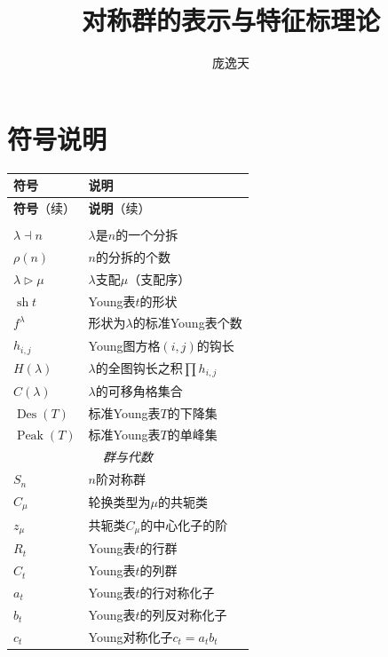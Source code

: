 \documentclass{sjtureport}
\title{对称群的表示与特征标理论}
\author{庞逸天}
\renewcommand{\arraystretch}{1}
\DeclareMathOperator{\sh}{sh}
\begin{document}
\maketitle

\tableofcontents

\chapter*{符号说明}

{\small
\setlength{\tabcolsep}{6pt}
\renewcommand{\arraystretch}{1.2}
\begin{longtable}{p{3.2cm}p{\dimexpr\linewidth-3.4cm-4\tabcolsep\relax}}
    \hline
    \textbf{符号} & \textbf{说明} \\
    \hline
    \endfirsthead
    \hline
    \textbf{符号}（续） & \textbf{说明}（续） \\
    \hline
    \endhead
    \hline
    \endfoot
    \multicolumn{2}{c}{\textit{组合基础}} \\ \hline
    $\lambda \dashv n$ & $\lambda$是$n$的一个分拆 \\
    $\rho(n)$ & $n$的分拆的个数 \\
    $\lambda\rhd\mu$ & $\lambda$支配$\mu$（支配序） \\
    $\sh t$ & Young表$t$的形状 \\
    $f^\lambda$ & 形状为$\lambda$的标准Young表个数 \\
    $h_{i,j}$ & Young图方格$(i,j)$的钩长 \\
    $H(\lambda)$ & $\lambda$的全图钩长之积$\prod h_{i,j}$ \\
    $C(\lambda)$ & $\lambda$的可移角格集合 \\
    $\operatorname{Des}(T)$ & 标准Young表$T$的下降集 \\
    $\operatorname{Peak}(T)$ & 标准Young表$T$的单峰集 \\ \hline
    \multicolumn{2}{c}{\textit{群与代数}} \\ \hline
    $S_n$ & $n$阶对称群 \\
    $C_\mu$ & 轮换类型为$\mu$的共轭类 \\
    $z_\mu$ & 共轭类$C_\mu$的中心化子的阶 \\
    $R_t$ & Young表$t$的行群 \\
    $C_t$ & Young表$t$的列群 \\
    $a_t$ & Young表$t$的行对称化子 \\
    $b_t$ & Young表$t$的列反对称化子 \\
    $c_t$ & Young对称化子$c_t = a_t b_t$ \\

\end{longtable}}
\end{document}
